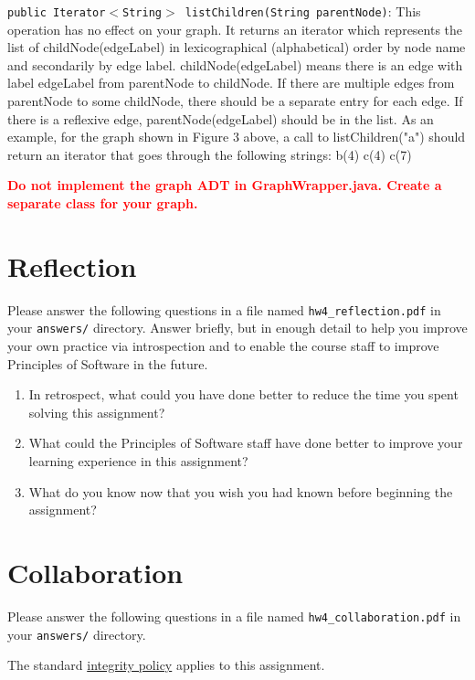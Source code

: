 \documentclass[11pt]{article}
\begin{document}
\noindent \texttt{public Iterator$<$String$>$ listChildren(String parentNode)}: This operation has no effect on your graph. It returns an iterator which represents the list of childNode(edgeLabel) in lexicographical (alphabetical) order by node name and secondarily by edge label. childNode(edgeLabel) means there is an edge with label edgeLabel from parentNode to childNode. If there are multiple edges from parentNode to some childNode, there should be a separate entry for each edge. If there is a reflexive edge, parentNode(edgeLabel) should be in the list.
As an example, for the graph shown in Figure 3 above, a call to listChildren("a") should return an iterator that goes through the following strings:
\newline
b(4)
\newline
c(4)
\newline
c(7)

\noindent \textcolor{red}{\textbf{Do not implement the graph ADT in GraphWrapper.java. Create a separate class for your graph.}}

\section*{Reflection}
Please answer the following questions in a file named \texttt{hw4\_reflection.pdf} in your \texttt{answers/} directory. Answer briefly, but in enough detail to help you improve your own practice via introspection and to enable the course staff to improve Principles of Software in the future.
\begin{enumerate}
\item In retrospect, what could you have done better to reduce the time you spent solving this assignment?
\item What could the Principles of Software staff have done better to improve your learning experience in this assignment?
\item What do you know now that you wish you had known before beginning the assignment?
\end{enumerate}

\section*{Collaboration}
Please answer the following questions in a file named \texttt{hw4\_collaboration.pdf} in your \texttt{answers/} directory.

\noindent The standard \href{https://www.cs.rpi.edu/academics/courses/spring23/csci2600/Documents/syllabus_CSCI_2600_Spring_2023.pdf}{integrity policy} applies to this assignment.
\end{document}

